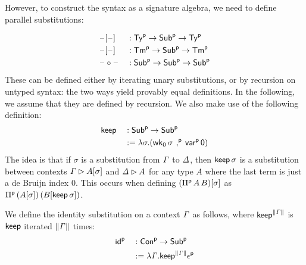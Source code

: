   However, to construct the syntax as a signature algebra, we need to define
  parallel substitutions:
\begin{definition}
  \begin{alignat*}{5}
  & \blank[\blank] && : \Tyu\ra\Subu\ra\Tyu \\
  & \blank[\blank] && : \Tmu\ra\Subu\ra\Tmu \\
  & \blank \circ \blank && : \Subu\ra\Subu\ra \Subu
  \end{alignat*}
These can be defined either by iterating unary substitutions, or by recursion
on untyped syntax: the two ways yield provably equal definitions. In the
following, we assume that they are defined by recursion. We also make use of the
following definition:
  \begin{alignat*}{5}
  & \keep && : \Subu \ra \Subu \\
   &&& := \lambda \sigma. (\wkO\,\sigma \,\consu\, \varu\, \mathsf{0})
  \end{alignat*}
  The idea is that if $\sigma$ is a substitution from $\GG$ to
  $\GD$, then $\keep\,\sigma$ is a substitution between contexts $\GG\ext A[\sigma]$
  and $\GD\ext A$ for any type $A$ where the last term is just a de Bruijn index $0$. This occurs when defining
  $(\Piu\,A\,B)[\sigma]$ as $\Piu\,(A[\sigma])\,(B[\keep \,\sigma])$.

  We define the identity substitution on a context $\GG$ as
  follows, where $\keep^{\length{\GG}}$ is $\keep$ iterated
  $\length{\GG}$ times:
\begin{alignat*}{5}
  & \idu && : \Conu \ra \Subu \\
  & && := \lambda \GG.\keep^{\length{\GG}} \epsilonu
  \end{alignat*}
\end{definition}

